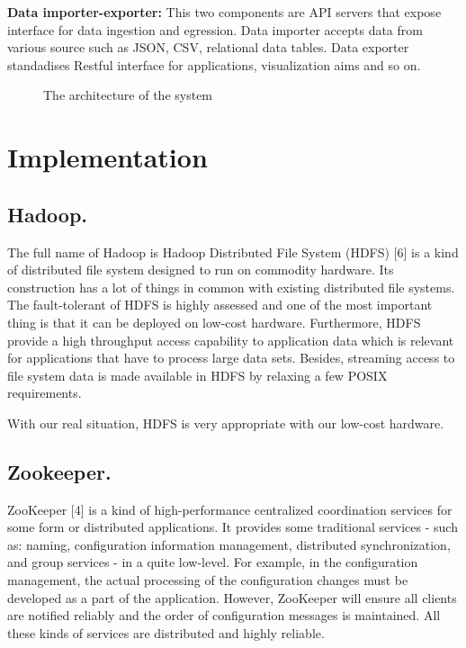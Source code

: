 \documentclass{acm_proc_article-sp}
\begin{document}
\textbf{Data importer-exporter:} This two components are API servers that expose interface for data ingestion and egression. Data importer accepts data from various source such as JSON, CSV, relational data tables. Data exporter standadises Restful interface for applications, visualization aims and so on.

\begin{figure}[!htb]
\centering
{}
\caption{The architecture of the system}
\end{figure}

\section{Implementation} 
	
\subsection{Hadoop. } The full name of Hadoop is Hadoop Distributed File System (HDFS) [6] is a kind of distributed file system designed to run on commodity hardware. Its construction has a lot of things in common with existing distributed file systems. The fault-tolerant of HDFS is highly assessed and one of the most important thing is that it can be deployed on low-cost hardware. Furthermore, HDFS provide a high throughput access capability to application data which is relevant for applications that have to process large data sets. Besides, streaming access to file system data is made available in HDFS by relaxing a few POSIX requirements.

\setlength{\parindent}{1cm} With our real situation, HDFS is very appropriate with our low-cost hardware.

\subsection{Zookeeper. }ZooKeeper [4] is a kind of high-performance centralized coordination services for some form or distributed applications. It provides some traditional services - such as: naming, configuration information management, distributed synchronization, and group services - in a quite low-level. For example, in the configuration management, the actual processing of the configuration changes must be developed as a part of the application. However, ZooKeeper will ensure all clients are notified reliably and the order of configuration messages is maintained. All these kinds of services are distributed and highly reliable.
\end{document}
